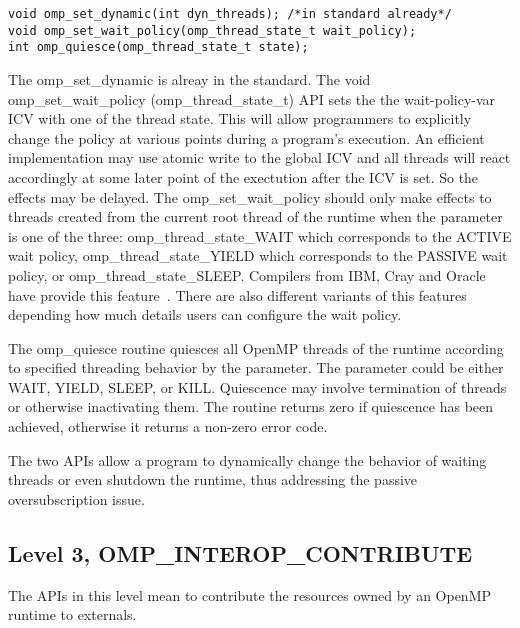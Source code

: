 \begin{lstlisting}[frame=single]
void omp_set_dynamic(int dyn_threads); /*in standard already*/
void omp_set_wait_policy(omp_thread_state_t wait_policy);
int omp_quiesce(omp_thread_state_t state);
\end{lstlisting}
The {\sf omp\_set\_dynamic} is alreay in the standard. The {\sf void omp\_set\_wait\_policy (omp\_thread\_state\_t)} API
sets the the wait-policy-var
ICV with one of the thread state. This will allow programmers to explicitly change the policy at various 
points during a program's execution. An efficient implementation may use atomic write to the 
global ICV and all threads will react accordingly at some later point of the exectution after the 
ICV is set. So the effects may be delayed. 
The {\sf omp\_set\_wait\_policy} should only make effects to threads created from the current root thread 
of the runtime when the parameter is one of the three:
{\sf omp\_thread\_state\_WAIT} which corresponds to the {\sf ACTIVE} wait policy, 
{\sf omp\_thread\_state\_YIELD} which corresponds to the {\sf PASSIVE} wait policy, or
{\sf omp\_thread\_state\_SLEEP}. 
Compilers from IBM, Cray and Oracle have provide this feature~\cite{ibmwait,craywait,oraclewait}.
There are also different variants of this features depending how much details users can configure
the wait policy.

The {\sf omp\_quiesce} routine quiesces all OpenMP threads of the runtime according to specified threading behavior by the parameter. The
parameter could be either WAIT, YIELD, SLEEP, or KILL. Quiescence may involve termination
 of threads or otherwise inactivating them. The routine returns zero if quiescence has been achieved, otherwise it returns a non-zero error code.

The two APIs allow a program to dynamically change the behavior of waiting threads or even shutdown the runtime, thus addressing the passive
oversubscription issue. 


\subsection{Level 3, OMP\_INTEROP\_CONTRIBUTE}
The APIs in this level mean to contribute the resources owned by an OpenMP runtime to externals. 

